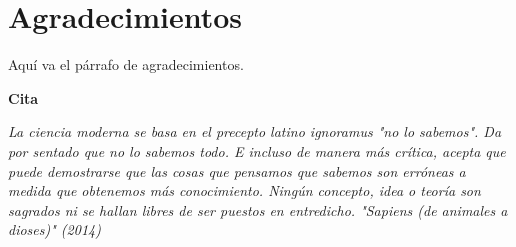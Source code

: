 \chapter*{Agradecimientos}

Aquí va el párrafo de agradecimientos.



\textbf{Cita}

\textit{La ciencia moderna se basa en el precepto latino ignoramus "no lo sabemos". Da por sentado que no lo sabemos todo. E incluso de manera más crítica, acepta que puede demostrarse que las cosas que pensamos que sabemos son erróneas a medida que obtenemos más conocimiento. Ningún concepto, idea o teoría son sagrados ni se hallan libres de ser puestos en entredicho. "Sapiens (de animales a dioses)" (2014)}

